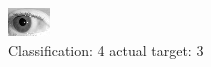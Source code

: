 \begin{figure}[h!]
\begin{center}
\includegraphics[width=0.60\columnwidth]{figures/ID203_class_4_target_3.png}
\end{center}
\caption{ Classification: 4 actual target: 3}
\label{fig:ID203_class_4_target_3}
\end{figure}
